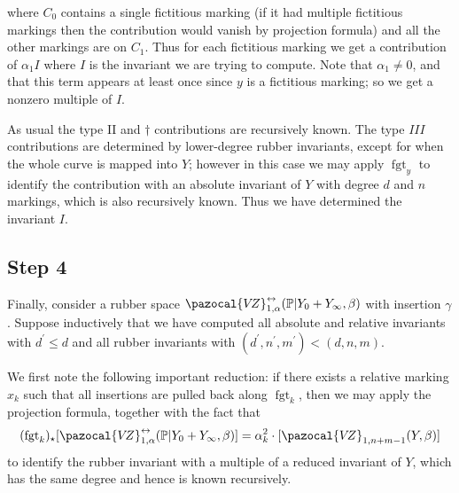 \documentclass[11pt]{amsart}
\newcommand{\sqC}{\scalebox{0.8}[1.3]{$\sqsubset$}}
\newcommand{\VZ}{\pazocal{V\!Z}}
\newcommand{\st}{\star}
\newcommand{\fgt}{\operatorname{fgt}}
\theoremstyle{definition}
\theoremstyle{definition}
\begin{document}
\begin{center}
\end{center}
where $C_0$ contains a single fictitious marking (if it had multiple fictitious markings then the contribution would vanish by projection formula) and all the other markings are on $C_1$. Thus for each fictitious marking we get a contribution of $\alpha_1 I$ where $I$ is the invariant we are trying to compute. Note that $\alpha_1 \neq 0$, and that this term appears at least once since $y$ is a fictitious marking; so we get a nonzero multiple of $I$.

As usual the type II and $\dag$ contributions are recursively known. The type $III$ contributions are determined by lower-degree rubber invariants, except for when the whole curve is mapped into $Y$; however in this case we may apply $\fgt_y$ to identify the contribution with an absolute invariant of $Y$ with degree $d$ and $n$ markings, which is also recursively known. Thus we have determined the invariant $I$.

\subsection*{Step 4} Finally, consider a rubber space $\VZ^{\leftrightarrow}_{1,\alpha}(\mathbb P|Y_0+Y_\infty,\beta)$ with insertion $\gamma$. Suppose inductively that we have computed all absolute and relative invariants with $d^\prime \leq d$ and all rubber invariants with $(d^\prime,n^\prime,m^\prime) < (d,n,m)$.

We first note the following important reduction: if there exists a relative marking $x_k$ such that all insertions are pulled back along $\fgt_{k}$, then we may apply the projection formula, together with the fact that
\begin{equation*} (\fgt_{k})_\st [\VZ^{\leftrightarrow}_{1,\alpha}(\mathbb P|Y_0+Y_\infty,\beta)] = \alpha_k^2 \cdot [\VZ_{1,n+m-1}(Y,\beta)] \end{equation*}
to identify the rubber invariant with a multiple of a reduced invariant of $Y$, which has the same degree and hence is known recursively.
\end{document}
